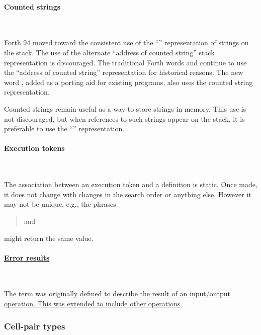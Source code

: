 \paragraph{Counted strings} ~ %
\label{rat:cstring}

Forth 94 moved toward the consistent use of the ``''
representation of strings on the stack. The use of the alternate
``address of counted string'' stack representation is discouraged.
The traditional Forth words  and  continue
to use the ``address of counted string'' representation for historical
reasons. The new word , added as a porting aid for existing
programs, also uses the counted string representation.

Counted strings remain useful as a way to store strings in memory.
This use is not discouraged, but when references to such strings
appear on the stack, it is preferable to use the ``''
representation.


\paragraph{Execution tokens} ~ %

The association between an execution token and a definition is static.
Once made, it does not change with changes in the search order or
anything else. However it may not be unique, e.g., the phrases
\begin{quote}\ttfamily
	  and \\
	 
\end{quote}
might return the same value.

\cbstart{}
\paragraph{\uline{Error results}} ~ %
\label{rat:ior}

\uline{%
The term  was originally defined to describe the result of
an input/output operation.  This was extended to include other
operations.}
\cbend

\subsubsection{Cell-pair types} %

